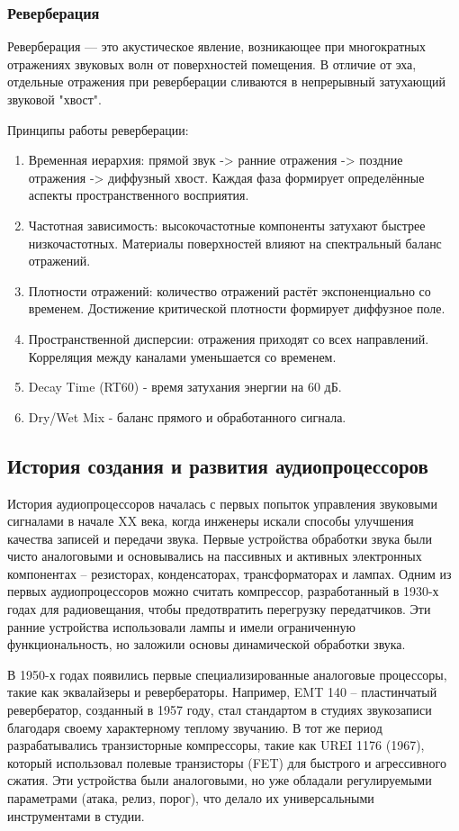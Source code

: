 \subsubsection{Реверберация}

Реверберация — это акустическое явление, возникающее при многократных отражениях звуковых волн от поверхностей помещения. В отличие от эха, отдельные отражения при реверберации сливаются в непрерывный затухающий звуковой "хвост".

Принципы работы реверберации:
\begin{enumerate}
	\item Временная иерархия: прямой звук -> ранние отражения -> поздние отражения -> диффузный хвост. Каждая фаза формирует определённые аспекты пространственного восприятия.
	\item Частотная зависимость: высокочастотные компоненты затухают быстрее низкочастотных. Материалы поверхностей влияют на спектральный баланс отражений.
	\item Плотности отражений: количество отражений растёт экспоненциально со временем. Достижение критической плотности формирует диффузное поле.
	\item Пространственной дисперсии: отражения приходят со всех направлений. Корреляция между каналами уменьшается со временем.
	\item Decay Time (RT60) - время затухания энергии на 60 дБ.
	\item Dry/Wet Mix - баланс прямого и обработанного сигнала.
\end{enumerate}

\subsection{История создания и развития аудиопроцессоров}
История аудиопроцессоров началась с первых попыток управления звуковыми сигналами в начале XX века, когда инженеры искали способы улучшения качества записей и передачи звука. Первые устройства обработки звука были чисто аналоговыми и основывались на пассивных и активных электронных компонентах – резисторах, конденсаторах, трансформаторах и лампах. Одним из первых аудиопроцессоров можно считать компрессор, разработанный в 1930-х годах для радиовещания, чтобы предотвратить перегрузку передатчиков. Эти ранние устройства использовали лампы и имели ограниченную функциональность, но заложили основы динамической обработки звука.

В 1950-х годах появились первые специализированные аналоговые процессоры, такие как эквалайзеры и ревербераторы. Например, EMT 140 – пластинчатый ревербератор, созданный в 1957 году, стал стандартом в студиях звукозаписи благодаря своему характерному теплому звучанию. В тот же период разрабатывались транзисторные компрессоры, такие как UREI 1176 (1967), который использовал полевые транзисторы (FET) для быстрого и агрессивного сжатия. Эти устройства были аналоговыми, но уже обладали регулируемыми параметрами (атака, релиз, порог), что делало их универсальными инструментами в студии.


